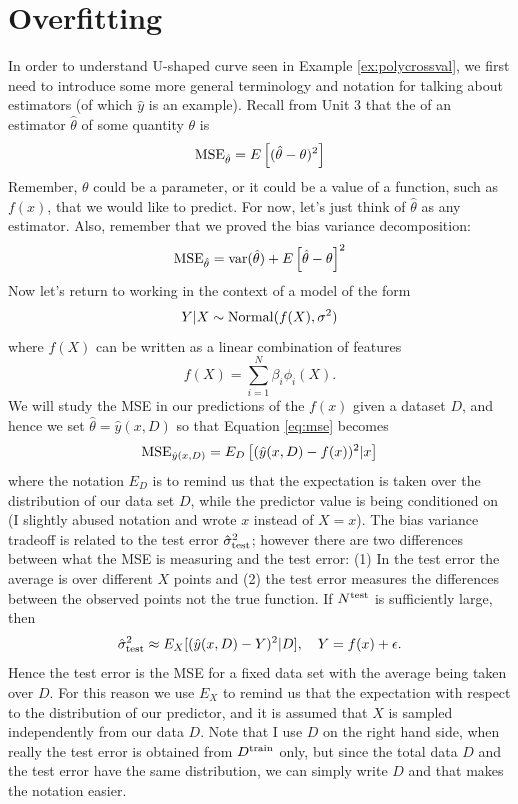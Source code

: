 \section{Overfitting}
 In order to understand U-shaped curve seen in Example \ref{ex:polycrossval},  we first need to introduce some more general terminology and notation for talking about estimators (of which $\hat{y}$ is an example). 
Recall from Unit 3 that the  of an estimator $\hat{\theta}$ of some quantity $\theta$ is 
\begin{equation}\label{eq:mse}
{\rm MSE}_{\hat{\theta}}= E\left[(\hat{\theta}- \theta)^2\right]
\end{equation}
Remember, $\theta$ could be a parameter, or it could be a value of a function, such as $f(x)$, that we would like to predict. 
For now, let's just think of $\hat{\theta}$ as any estimator. Also, remember that we proved the bias variance decomposition:
\begin{equation}\label{eq:biasvar}
{\rm MSE}_{\hat{\theta}} = {\rm var}(\hat{\theta}) + E\left[\hat{\theta}-\theta\right]^2
\end{equation}
 Now let's return to working in the context of a model of the form 
\begin{equation*}
Y|X \sim {\rm Normal}(f(X),\sigma^2)
\end{equation*}
where $f(X)$ can be written as a linear combination of features
\begin{equation*}
f(X) = \sum_{i=1}^N\beta_i \phi_i(X). 
\end{equation*}
We will study the MSE in our predictions of the $f(x)$ given a dataset $D$, and hence we set $\hat{\theta} = \hat{y}(x,D)$ so that Equation \ref{eq:mse} becomes
\begin{equation*}
{\rm MSE}_{\hat{y}(x,D)} = E_D\left[(\hat{y}(x,D)- f(x))^2|x\right]
\end{equation*}
where the notation $E_D$ is to remind us that the expectation is taken over the distribution of our data set $D$, while the predictor value is being conditioned on (I slightly abused notation and wrote $x$ instead of $X=x$). The bias variance tradeoff is related to the test error $\hat{\sigma}_{\rm test}^2$; however there are two differences between what the MSE is measuring and the test error: (1) In the test error the average is over different $X$ points and (2) the test error measures the differences between the observed points not the true function.  If $N^{\rm test}$ is sufficiently large, then 
\begin{equation}
\hat{\sigma}_{\rm test}^2 \approx  E_X[(\hat{y}(x,D)- Y)^2|D],\quad Y= f(x) + \epsilon. 
\end{equation}
Hence the test error is the MSE for a fixed data set with the average being taken over $D$.  For this reason we use $E_X$ to remind us that the expectation with respect to the distribution of our predictor, and it is assumed that $X$ is sampled independently from our data $D$. 
Note that I use $D$ on the right hand side, when really the test error is obtained from $D^{\rm train}$ only, but since the total data $D$ and the test error have the same distribution, we can simply write $D$ and that makes the notation easier. 


